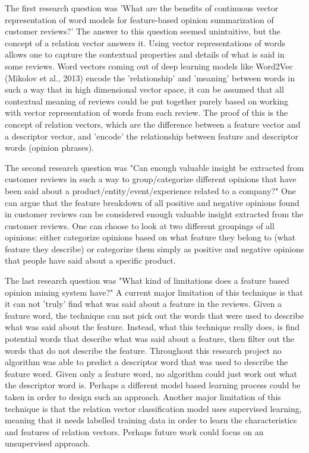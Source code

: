 \documentclass{sig-alternate}
\begin{document}
The first research question was 'What are the benefits of continuous vector representation of word models for feature-based opinion summarization of customer reviews?' The answer to this question seemed unintuitive, but the concept of a relation vector answers it. Using vector representations of words allows one to capture the contextual properties and details of what is said in some reviews. Word vectors coming out of deep learning models like Word2Vec (Mikolov et al., 2013) encode the 'relationship' and 'meaning' between words in such a way that in high dimensional vector space, it can be assumed that all contextual meaning of reviews could be put together purely based on working with vector representation of words from each review. The proof of this is the concept of relation vectors, which are the difference between a feature vector and a descriptor vector, and 'encode' the relationship between feature and descriptor words (opinion phrases).

The second research question was "Can enough valuable insight be extracted from customer reviews in such a way to group/categorize different opinions that have been said about a product/entity/event/experience related to a company?" One can argue that the feature breakdown of all positive and negative opinions found in customer reviews can be considered enough valuable insight extracted from the customer reviews. One can choose to look at two different groupings of all opinions: either categorize opinions based on what feature they belong to (what feature they describe) or categorize them simply as positive and negative opinions that people have said about a specific product.

The last research question was "What kind of limitations does a feature based opinion mining system have?" A current major limitation of this technique is that it can not 'truly' find what was said about a feature in the reviews. Given a feature word, the technique can not pick out the words that were used to describe what was said about the feature. Instead, what this technique really does, is find potential words that describe what was said about a feature, then filter out the words that do not describe the feature. Throughout this research project no algorithm was able to predict a descriptor word that was used to describe the feature word. Given only a feature word, no algorithm could just work out what the descriptor word is. Perhaps a different model based learning process could be taken in order to design such an approach. Another major limitation of this technique is that the relation vector classification model uses supervised learning, meaning that it needs labelled training data in order to learn the characteristics and features of relation vectors. Perhaps future work could focus on an unsupervised approach.
\end{document}
